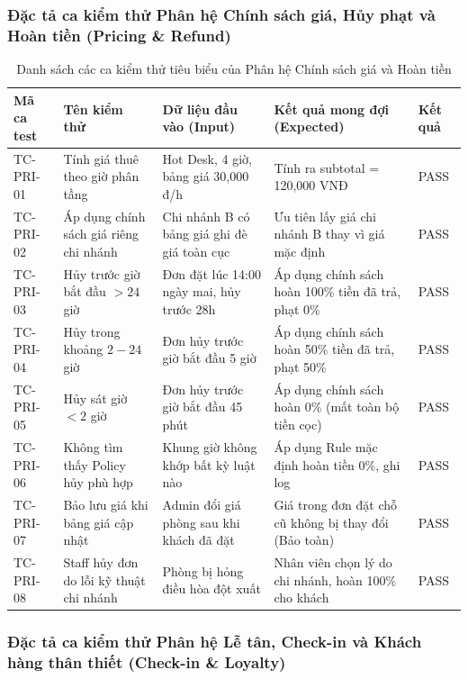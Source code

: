\subsubsection{Đặc tả ca kiểm thử Phân hệ Chính sách giá, Hủy phạt và Hoàn tiền (Pricing \& Refund)}

\begin{table}[H]
\centering
\caption{Danh sách các ca kiểm thử tiêu biểu của Phân hệ Chính sách giá và Hoàn tiền}
\label{tab:tc-pricing}
\renewcommand{\arraystretch}{1.25}
\begin{tabular}{|p{2.2cm}|p{3.5cm}|p{3.5cm}|p{4.2cm}|p{1.2cm}|}
\hline
\textbf{Mã ca test} & \textbf{Tên kiểm thử} & \textbf{Dữ liệu đầu vào (Input)} & \textbf{Kết quả mong đợi (Expected)} & \textbf{Kết quả} \\
\hline
TC-PRI-01 & Tính giá thuê theo giờ phân tầng & Hot Desk, 4 giờ, bảng giá 30,000 đ/h & Tính ra subtotal = 120,000 VNĐ & PASS \\
\hline
TC-PRI-02 & Áp dụng chính sách giá riêng chi nhánh & Chi nhánh B có bảng giá ghi đè giá toàn cục & Ưu tiên lấy giá chi nhánh B thay vì giá mặc định & PASS \\
\hline
TC-PRI-03 & Hủy trước giờ bắt đầu $> 24$ giờ & Đơn đặt lúc 14:00 ngày mai, hủy trước 28h & Áp dụng chính sách hoàn 100\% tiền đã trả, phạt 0\% & PASS \\
\hline
TC-PRI-04 & Hủy trong khoảng $2 - 24$ giờ & Đơn hủy trước giờ bắt đầu 5 giờ & Áp dụng chính sách hoàn 50\% tiền đã trả, phạt 50\% & PASS \\
\hline
TC-PRI-05 & Hủy sát giờ $< 2$ giờ & Đơn hủy trước giờ bắt đầu 45 phút & Áp dụng chính sách hoàn 0\% (mất toàn bộ tiền cọc) & PASS \\
\hline
TC-PRI-06 & Không tìm thấy Policy hủy phù hợp & Khung giờ không khớp bất kỳ luật nào & Áp dụng Rule mặc định hoàn tiền 0\%, ghi log & PASS \\
\hline
TC-PRI-07 & Bảo lưu giá khi bảng giá cập nhật & Admin đổi giá phòng sau khi khách đã đặt & Giá trong đơn đặt chỗ cũ không bị thay đổi (Bảo toàn) & PASS \\
\hline
TC-PRI-08 & Staff hủy đơn do lỗi kỹ thuật chi nhánh & Phòng bị hỏng điều hòa đột xuất & Nhân viên chọn lý do chi nhánh, hoàn 100\% cho khách & PASS \\
\hline
\end{tabular}
\end{table}

\subsubsection{Đặc tả ca kiểm thử Phân hệ Lễ tân, Check-in và Khách hàng thân thiết (Check-in \& Loyalty)}

